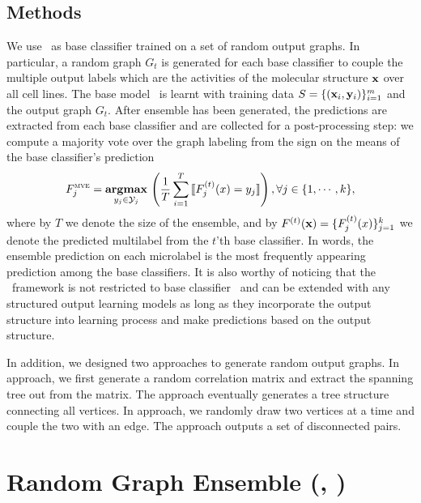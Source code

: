 {%
%
\subsection{Methods}

We use \mmcrf\ as base classifier trained on a set of random output graphs.
In particular, a random graph $G_t$ is generated for each base classifier to couple the multiple output labels which are the activities of the molecular structure $\mathbf {x}$ over all cell lines.
The base model \mmcrf\ is learnt with training data $S=\{(\mathbf {x}_i,\mathbf {y}_i)\}_{i=1}^{m}$ and the output graph $G_t$.
After ensemble has been generated, the predictions are extracted from each base classifier and are collected for a post-processing step: we compute a majority vote over the graph labeling from the sign on the means of the base classifier's prediction
\begin{align*}
	F_j^{\text{{\sc mve}}}=\underset{y_j\in\mathcal{Y}_j}{\textbf{argmax}}\,\left(\frac{1}{T}\sum_{i=1}^{T}{\llbracket F_j^{(t)}(x)=y_j \rrbracket}\right), \forall j\in\{1,\cdots,k\},
\end{align*}
where by $T$ we denote the size of the ensemble, and by $F^{(t)}(\mathbf {x})=\{F^{(t)}_j(x)\}_{j=1}^{k}$ we denote the predicted multilabel from the $t$'th base classifier.
In words, the ensemble prediction on each microlabel is the most frequently appearing prediction among the base classifiers.
It is also worthy of noticing that the \mve\ framework is not restricted to base classifier \mmcrf\ and can be extended with any structured output learning models as long as they incorporate the output structure into learning process and make predictions based on the output structure.

In addition, we designed two approaches to generate random output graphs.
In  approach, we first generate a random correlation matrix and extract the spanning tree out from the matrix.
The approach eventually generates a tree structure connecting all vertices.
In  approach, we randomly draw two vertices at a time and couple the two with an edge.
The approach outputs a set of disconnected pairs.



%
%
\section{Random Graph Ensemble (\amm, \mam)} \label{sc_su14a}

}
